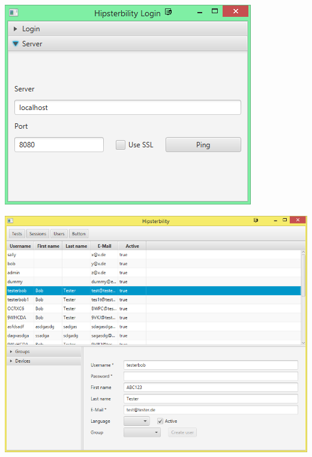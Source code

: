 \begin{minipage}[t]{\textwidth}
\centering
	\includegraphics{img/client/login2}
	\label{fig:client_login_server}
\end{minipage}

\begin{minipage}[t]{\textwidth}
\centering
	\includegraphics[width = \linewidth]{img/client/hipsterbility_benutzer}
	\label{fig:hipsterbility_benutzer}
\end{minipage}


